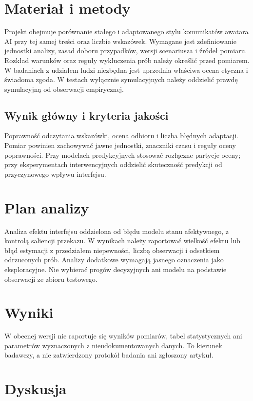 \documentclass[11pt,a4paper]{article}
\begin{document}
\section{Materiał i metody}

Projekt obejmuje porównanie stałego i adaptowanego stylu komunikatów awatara AI przy tej samej treści oraz liczbie wskazówek. Wymagane jest zdefiniowanie jednostki analizy, zasad doboru przypadków, wersji scenariusza i źródeł pomiaru. Rozkład warunków oraz reguły wykluczenia prób należy określić przed pomiarem. W badaniach z udziałem ludzi niezbędna jest uprzednia właściwa ocena etyczna i świadoma zgoda. W testach wyłącznie symulacyjnych należy oddzielić prawdę symulacyjną od obserwacji empirycznej.

\subsection{Wynik główny i kryteria jakości}

Poprawność odczytania wskazówki, ocena odbioru i liczba błędnych adaptacji. Pomiar powinien zachowywać jawne jednostki, znaczniki czasu i reguły oceny poprawności. Przy modelach predykcyjnych stosować rozłączne partycje oceny; przy eksperymentach interwencyjnych oddzielić skuteczność predykcji od przyczynowego wpływu interfejsu.

\section{Plan analizy}

Analiza efektu interfejsu oddzielona od błędu modelu stanu afektywnego, z kontrolą saliencji przekazu. W wynikach należy raportować wielkość efektu lub błąd estymacji z przedziałem niepewności, liczbą obserwacji i odsetkiem odrzuconych prób. Analizy dodatkowe wymagają jasnego oznaczenia jako eksploracyjne. Nie wybierać progów decyzyjnych ani modelu na podstawie obserwacji ze zbioru testowego.

\section{Wyniki}

W obecnej wersji nie raportuje się wyników pomiarów, tabel statystycznych ani parametrów wyznaczonych z nieudokumentowanych danych. To kierunek badawczy, a nie zatwierdzony protokół badania ani zgłoszony artykuł.

\section{Dyskusja}
\end{document}
